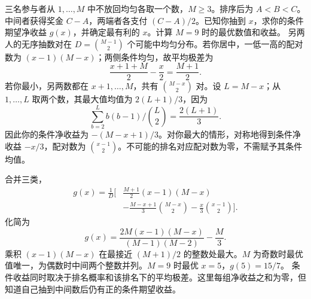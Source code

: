 三名参与者从 $1,\ldots,M$ 中不放回均匀各取一个数，$M\ge3$。排序后为 $A<B<C$。中间者获得奖金 $C-A$，两端者各支付 $(C-A)/2$。已知你抽到 $x$，求你的条件期望净收益 $g(x)$，并确定最有利的 $x$。计算 $M=9$ 时的最优数值和收益。
\solution 另两人的无序抽数对在 $D=\binom{M-1}{2}$ 个可能中均匀分布。若你居中，一低一高的配对数为 $(x-1)(M-x)$；两侧条件均匀，故平均极差为
\[
\frac{x+1+M}{2}-\frac x2=\frac{M+1}{2}.
\]
若你最小，另两数都在 $x+1,\ldots,M$，共有 $\binom{M-x}{2}$ 对。设 $L=M-x$；从 $1,\ldots,L$ 取两个数，其最大值均值为 $2(L+1)/3$，因为
\[
\sum_{b=2}^Lb(b-1)\big/\binom L2=\frac{2(L+1)}3.
\]
因此你的条件净收益为 $-(M-x+1)/3$。对你最大的情形，对称地得到条件净收益 $-x/3$，配对数为 $\binom{x-1}{2}$。不可能的排名对应配对数为零，不需赋予其条件均值。

合并三类，
\[
\begin{aligned}
g(x)=\frac1D\bigg[&\frac{M+1}{2}(x-1)(M-x)\\
&-\frac{M-x+1}{3}\binom{M-x}{2}
-\frac{x}{3}\binom{x-1}{2}\bigg].
\end{aligned}
\]
化简为
\[
\boxed{g(x)=\frac{2M(x-1)(M-x)}{(M-1)(M-2)}-\frac M3.}
\]
乘积 $(x-1)(M-x)$ 在最接近 $(M+1)/2$ 的整数处最大。$M$ 为奇数时最优值唯一，为偶数时中间两个整数并列。$M=9$ 时最优 $x=5$，$g(5)=15/7$。
\insight 条件收益同时取决于排名概率和该排名下的平均极差。这里每组净收益之和为零，但知道自己抽到中间数后仍有正的条件期望收益。
